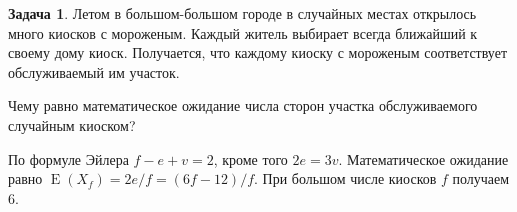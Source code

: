 \documentclass[nobib]{tufte-handout}
\theoremstyle{definition}
\newtheorem{problem}{Задача}
\DeclareMathOperator{\E}{E}
\begin{document}
\begin{problem}
Летом в большом-большом городе в случайных местах открылось много киосков с мороженым. Каждый житель выбирает всегда ближайший к своему дому киоск. Получается, что каждому киоску с мороженым соответствует обслуживаемый им участок.


Чему равно математическое ожидание числа сторон участка обслуживаемого случайным киоском?


\begin{sol}
По формуле Эйлера $f-e+v=2$, кроме того $2e=3v$. Математическое ожидание равно $\E(X_f)=2e/f=(6f-12)/f$. При большом числе киосков $f$ получаем $6$.
\end{sol}

\end{problem}
\end{document}

